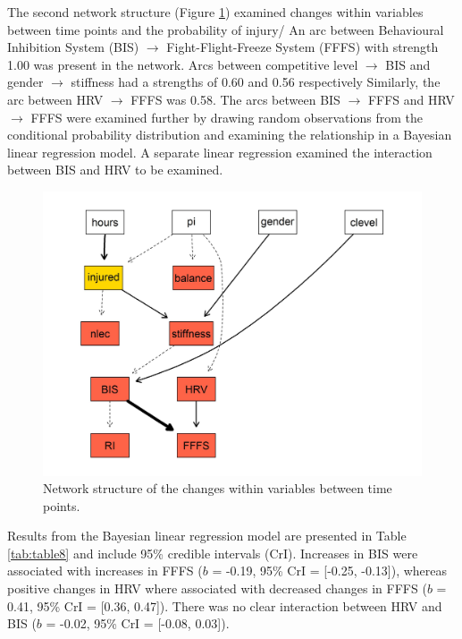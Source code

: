 \documentclass[
  english,
  man]{apa6}
\begin{document}
The second network structure (Figure \ref{fig:fig4}) examined changes within variables between time points and the probability of injury/ An arc between Behavioural Inhibition System (BIS) \(\rightarrow\) Fight-Flight-Freeze System (FFFS) with strength 1.00 was present in the network.
Arcs between competitive level \(\rightarrow\) BIS and gender \(\rightarrow\) stiffness had a strengths of 0.60 and 0.56 respectively Similarly, the arc between HRV \(\rightarrow\) FFFS was 0.58.
The arcs between BIS \(\rightarrow\) FFFS and HRV \(\rightarrow\) FFFS were examined further by drawing random observations from the conditional probability distribution and examining the relationship in a Bayesian linear regression model.
A separate linear regression examined the interaction between BIS and HRV to be examined.

\begin{figure}

{\centering \includegraphics[width=1\linewidth]{figures_doc/Fig4} 

}

\caption{Network structure of the changes within variables between time points.}\label{fig:fig4}
\end{figure}

Results from the Bayesian linear regression model are presented in Table \ref{tab:table8} and include 95\% credible intervals (CrI).
Increases in BIS were associated with increases in FFFS (\(b\) = -0.19, 95\% CrI = {[}-0.25, -0.13{]}), whereas positive changes in HRV where associated with decreased changes in FFFS (\(b\) = 0.41, 95\% CrI = {[}0.36, 0.47{]}).
There was no clear interaction between HRV and BIS (\(b\) = -0.02, 95\% CrI = {[}-0.08, 0.03{]}).
\end{document}
